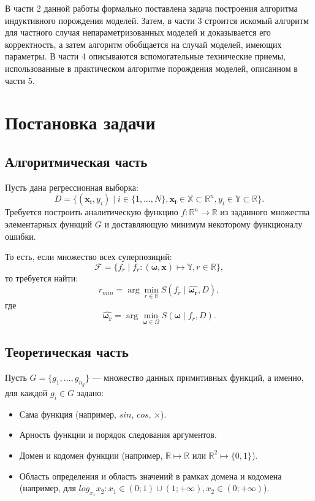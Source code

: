 \documentclass[12pt,a4paper]{amsart}
\begin{document}
В части 2 данной работы формально поставлена задача построения алгоритма
индуктивного порождения моделей. Затем, в части 3 строится искомый алгоритм
для частного случая непараметризованных моделей и доказывается его корректность,
а затем алгоритм обобщается на случай моделей, имеющих параметры. В части 4
описываются вспомогательные технические приемы, использованные в практическом
алгоритме порождения моделей, описанном в части 5.

\section{Постановка задачи}

\subsection{Алгоритмическая часть}

Пусть дана регрессионная выборка:
\[
D = \{ (\mathbf{x_i}, y_i) \mid i \in \{1, \dots, N\},
			\mathbf{x_i} \in \mathbb{X} \subset \mathbb{R}^n,
			y_i \in \mathbb{Y} \subset \mathbb{R} \}.
\]
Требуется построить аналитическую функцию $f : \mathbb{R}^n \rightarrow \mathbb{R}$ из
заданного множества элементарных функций $G$ и доставляющую минимум
некоторому функционалу ошибки.

То есть, если множество всех суперпозиций:
\[
\mathcal{F} = \{ f_r \mid
			f_r : (\boldsymbol{\omega}, \mathbf{x}) \mapsto \mathbb{Y},
			r \in \mathbb{R} \},
\]
то требуется найти:
\[
r_{min} = \arg \min_{r \in \mathbb{R}} S (f_r \mid \boldsymbol{\hat{\omega_r}}, D),
\]
где
\[
\boldsymbol{\hat{\omega_r}} = \arg \min_{\boldsymbol{\omega} \in \Omega} S(\boldsymbol{\omega} \mid f_r, D).
\]

\subsection{Теоретическая часть}

Пусть $G = \{ g_1, \dots, g_{n_g} \}$ --- множество данных примитивных
функций, а именно, для каждой $g_i \in G$ задано:

\begin{itemize}
  \item Сама функция (например, $sin$, $cos$, $\times$).
  \item Арность функции и порядок следования аргументов.
  \item Домен и кодомен функции (например, $\mathbb{R} \mapsto \mathbb{R}$
	или $\mathbb{R}^2 \mapsto \{0, 1\}$).
  \item Область определения и область значений в рамках домена и кодомена (например,
	для $log_{x_1} x_2 : x_1 \in (0; 1) \cup (1; +\infty), x_2 \in (0; +\infty)$).
\end{itemize}
\end{document}
